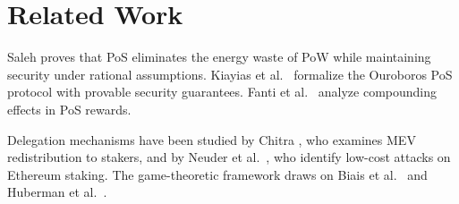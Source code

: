 \section{Related Work}
\label{sec:related}

Saleh \cite{saleh2021blockchain} proves that PoS eliminates the energy waste of PoW while maintaining security under rational assumptions. Kiayias et al.\ \cite{kiayias2017ouroboros} formalize the Ouroboros PoS protocol with provable security guarantees. Fanti et al.\ \cite{fanti2019economics} analyze compounding effects in PoS rewards.

Delegation mechanisms have been studied by Chitra \cite{chitra2022improving}, who examines MEV redistribution to stakers, and by Neuder et al.\ \cite{neuder2021}, who identify low-cost attacks on Ethereum staking. The game-theoretic framework draws on Biais et al.\ \cite{biais2019blockchain} and Huberman et al.\ \cite{huberman2021monopoly}.

